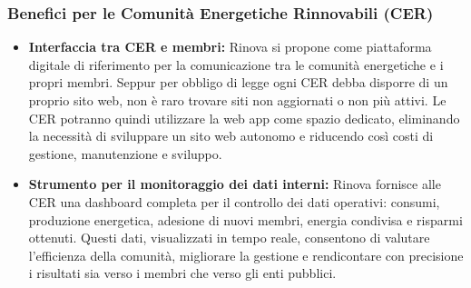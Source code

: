    
\subsubsection*{Benefici per le Comunità Energetiche Rinnovabili (CER)}
\begin{itemize}
    \item \textbf{Interfaccia tra CER e membri:}  
    Rinova si propone come piattaforma digitale di riferimento per la comunicazione tra le comunità energetiche e i propri membri.  
    Seppur per obbligo di legge ogni CER debba disporre di un proprio sito web, non è raro trovare siti non aggiornati o non più attivi. Le CER potranno quindi utilizzare la web app come spazio dedicato, eliminando la necessità di sviluppare un sito web autonomo e riducendo così costi di gestione, manutenzione e sviluppo.
    
    \item \textbf{Strumento per il monitoraggio dei dati interni:}  
    Rinova fornisce alle CER una dashboard completa per il controllo dei dati operativi: consumi, produzione energetica, adesione di nuovi membri, energia condivisa e risparmi ottenuti.  
    Questi dati, visualizzati in tempo reale, consentono di valutare l’efficienza della comunità, migliorare la gestione e rendicontare con precisione i risultati sia verso i membri che verso gli enti pubblici.
\end{itemize}

